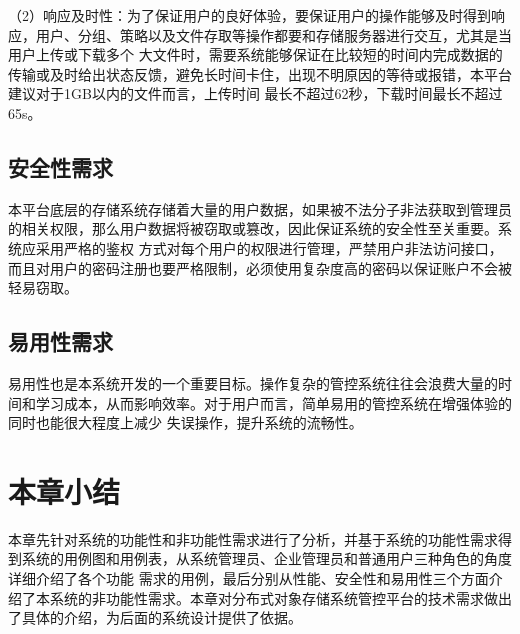 （2）响应及时性：为了保证用户的良好体验，要保证用户的操作能够及时得到响应，用户、分组、策略以及文件存取等操作都要和存储服务器进行交互，尤其是当用户上传或下载多个
大文件时，需要系统能够保证在比较短的时间内完成数据的传输或及时给出状态反馈，避免长时间卡住，出现不明原因的等待或报错，本平台建议对于1GB以内的文件而言，上传时间
最长不超过62秒，下载时间最长不超过65s。




\subsection{安全性需求}

本平台底层的存储系统存储着大量的用户数据，如果被不法分子非法获取到管理员的相关权限，那么用户数据将被窃取或篡改，因此保证系统的安全性至关重要。系统应采用严格的鉴权
方式对每个用户的权限进行管理，严禁用户非法访问接口，而且对用户的密码注册也要严格限制，必须使用复杂度高的密码以保证账户不会被轻易窃取。

\subsection{易用性需求}

易用性也是本系统开发的一个重要目标。操作复杂的管控系统往往会浪费大量的时间和学习成本，从而影响效率。对于用户而言，简单易用的管控系统在增强体验的同时也能很大程度上减少
失误操作，提升系统的流畅性。

\section{本章小结}

本章先针对系统的功能性和非功能性需求进行了分析，并基于系统的功能性需求得到系统的用例图和用例表，从系统管理员、企业管理员和普通用户三种角色的角度详细介绍了各个功能
需求的用例，最后分别从性能、安全性和易用性三个方面介绍了本系统的非功能性需求。本章对分布式对象存储系统管控平台的技术需求做出了具体的介绍，为后面的系统设计提供了依据。